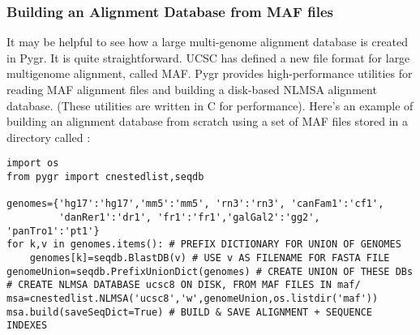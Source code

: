 \documentclass{howto}
\begin{document}
\subsubsection{Building an Alignment Database from MAF files}
It may be helpful to see how a large multi-genome alignment database
is created in Pygr.  It is quite straightforward.
UCSC has defined a new file format for large multigenome alignment,
called MAF.  Pygr provides high-performance utilities for reading
MAF alignment files and building a disk-based NLMSA alignment database.
(These utilities are written in C for performance).  Here's an
example of building an alignment database from scratch using a
set of MAF files stored in a directory called :

\begin{verbatim}
import os
from pygr import cnestedlist,seqdb

genomes={'hg17':'hg17','mm5':'mm5', 'rn3':'rn3', 'canFam1':'cf1', 
         'danRer1':'dr1', 'fr1':'fr1','galGal2':'gg2', 'panTro1':'pt1'}
for k,v in genomes.items(): # PREFIX DICTIONARY FOR UNION OF GENOMES
    genomes[k]=seqdb.BlastDB(v) # USE v AS FILENAME FOR FASTA FILE
genomeUnion=seqdb.PrefixUnionDict(genomes) # CREATE UNION OF THESE DBs
# CREATE NLMSA DATABASE ucsc8 ON DISK, FROM MAF FILES IN maf/
msa=cnestedlist.NLMSA('ucsc8','w',genomeUnion,os.listdir('maf'))
msa.build(saveSeqDict=True) # BUILD & SAVE ALIGNMENT + SEQUENCE INDEXES
\end{verbatim}
\end{document}
